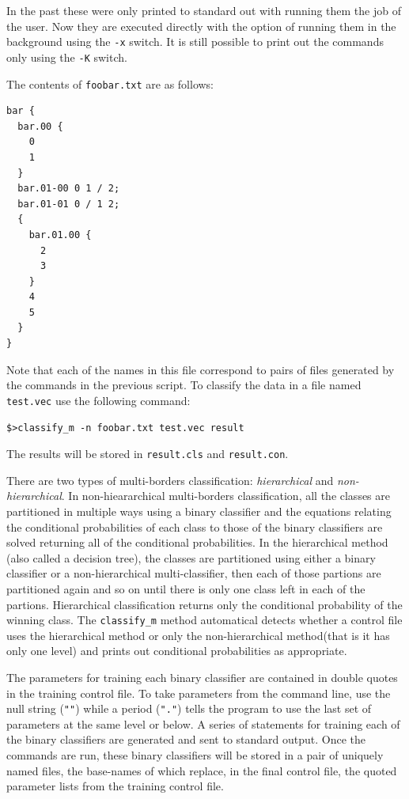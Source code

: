 \documentclass[12pt]{article}
\begin{document}
In the past these were only printed to standard out with running them the
job of the user. Now they are executed directly with the option of 
running them in the background using the \verb"-x" switch.
It is still possible to print out the commands only using the \verb"-K"
switch.

The contents of \verb"foobar.txt" are as follows:

\begin{verbatim}
bar {
  bar.00 {
    0
    1 
  }
  bar.01-00 0 1 / 2;
  bar.01-01 0 / 1 2;
  {
    bar.01.00 {
      2
      3
    }
    4
    5
  }
}
\end{verbatim}

Note that each of the names in this file correspond to pairs of files generated by the commands in the previous script. To classify the data in a file named \verb"test.vec" use the following command:

\begin{verbatim}
$>classify_m -n foobar.txt test.vec result
\end{verbatim}

The results will be stored in \verb"result.cls" and \verb"result.con".

  There are two types of multi-borders classification: {\it hierarchical} and {\it non-hierarchical}.  In non-hieararchical multi-borders classification, all the classes are partitioned in multiple ways using a binary classifier and the equations relating the conditional probabilities of each class to those of the binary classifiers are solved returning all of the conditional probabilities.  In the hierarchical method (also called a decision tree), the classes are partitioned using either a binary classifier or a non-hierarchical multi-classifier, then each of those partions are partitioned again and so on until there is only one class left in each of the partions.  Hierarchical classification returns only the conditional probability of the winning class.  The \verb/classify_m/ method automatical detects whether a control file uses the hierarchical method or only the non-hierarchical method(that is it has only one level) and prints out conditional probabilities as appropriate.  

  The parameters for training each binary classifier are contained in double quotes in the training control file.  To take parameters from the command line, use the null string (\verb/""/) while a period (\verb/"."/) tells the program to use the last set of parameters at the same level or below.  A series of statements for training each of the binary classifiers are generated and sent to standard output.  Once the commands are run, these binary classifiers will be stored in a pair of uniquely named files, the base-names of which replace, in the final control file, the quoted parameter lists from the training control file.
\end{document}
